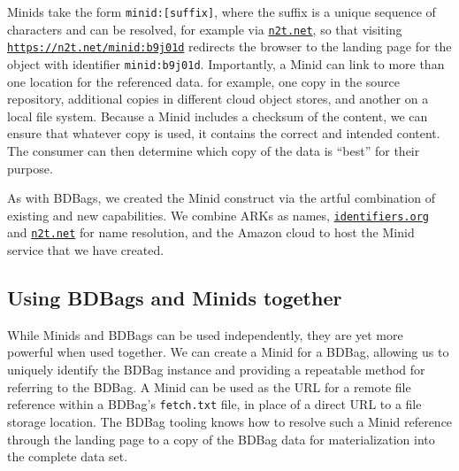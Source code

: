 \documentclass[11pt]{article}
\begin{document}
Minids  take the form \texttt{minid:[suffix]}, where  the suffix is a unique sequence of characters
and can be resolved, for example via \texttt{\href{https://n2t.net}{n2t.net}},
so that visiting
\texttt{\href{https://n2t.net/minid:b9j01d}{https://n2t.net/minid:b9j01d}} 
redirects the browser to the landing page for the
object with identifier \texttt{minid:b9j01d}.
Importantly, a Minid can link to more than one location for the referenced data.
for example, one copy in the source repository, 
additional copies in different cloud object stores, and another on a local file system.
Because a Minid includes a checksum of the content, 
we can ensure that whatever copy is used, it contains the correct and intended content.
The consumer can then determine which copy of the data is ``best'' for their purpose.

As with BDBags, we created the Minid construct via the artful combination of existing and new capabilities.
We combine ARKs as names, 
\texttt{\href{https://identifiers.org}{identifiers.org}} and \texttt{\href{https://n2t.net}{n2t.net}} for name resolution,
and the Amazon cloud to host the Minid service that we have created.

\vspace{2ex}

\noindent{}
 


\subsection{Using BDBags and Minids together} 

While Minids and BDBags can be used independently, they are yet more powerful when used together. 
We can create a Minid for a BDBag, 
allowing us to uniquely identify the BDBag instance and providing a repeatable method for referring to the BDBag. 
A Minid can be used as the URL for a remote file reference within a BDBag's \texttt{fetch.txt} file,
in place of a direct URL to a file storage location.  
The BDBag tooling knows how to resolve such a Minid reference
through the landing page to a copy of the BDBag data
for materialization into the complete data set.  
\end{document}
